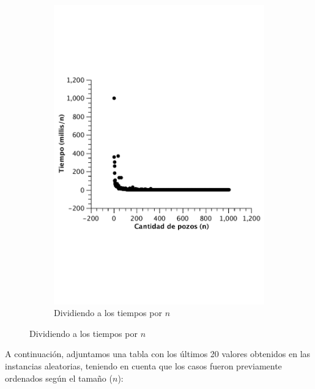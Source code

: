 \begin{figure}[H]
        \begin{subfigure}[b]{0.5\textwidth}
                \includegraphics[width=\textwidth]{imagenes/ej3-mejor-const.pdf}
                \caption{Dividiendo a los tiempos por $n$}
        \end{subfigure}

\end{figure}

A continuación, adjuntamos una tabla con los últimos 20 valores obtenidos en las instancias aleatorias, teniendo en cuenta que los casos fueron previamente ordenados según el tamaño ($n$):

